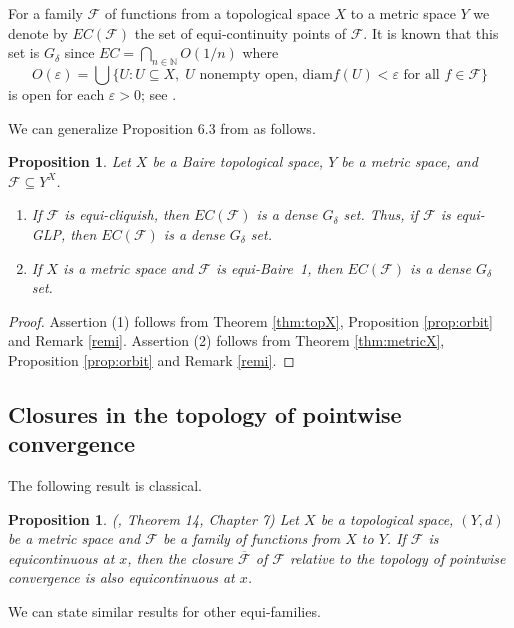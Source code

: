 \documentclass[a4paper]{amsart}
\theoremstyle{plain}
\newtheorem{proposition}[theorem]{Proposition}
\theoremstyle{definition}
\theoremstyle{remark}
\numberwithin{equation}{section}
\begin{document}
    For a family $\mathcal F$ of functions from a topological space $X$ to a metric space $Y$ we denote by $EC(\mathcal F)$ the set of equi-continuity points of $\mathcal F$. It is known that this set is $G_\delta$ since $EC=\bigcap_{n\in\mathbb N}O(1/n)$ where
    $$O(\varepsilon)=\bigcup\{U\colon U\subseteq X,\; U \text{ nonempty open, diam}f(U)<\varepsilon\text{ for all }f\in\mathcal F\}$$
    is open for each $\varepsilon>0$; see \cite{FHT}.
    
We can generalize Proposition 6.3 from \cite{BHH} as follows.

\begin{proposition} \label{propa3}
  Let $X$ be a Baire topological space, $Y$ be a metric space, and $\mathcal F\subseteq Y^X$. 
  \begin{enumerate}
  \item If $\mathcal F$ is equi-cliquish, then $EC(\mathcal F)$ is a dense $G_\delta$ set. Thus, if $\mathcal F$ is equi-GLP, then $EC(\mathcal F)$ is a dense $G_\delta$ set.
  \item If $X$ is a metric space and $\mathcal F$ is equi-Baire~1, then $EC(\mathcal F)$ is a dense $G_\delta$ set.
  \end{enumerate}
\end{proposition}
\begin{proof}
    Assertion (1) follows from Theorem \ref{thm:topX}, Proposition \ref{prop:orbit} and Remark \ref{remi}. Assertion (2) follows from Theorem \ref{thm:metricX}, Proposition \ref{prop:orbit} and Remark \ref{remi}.
    \end{proof}

\subsection{Closures in the topology of pointwise convergence}

The following result is classical.

\begin{proposition} (\cite{Kel}, Theorem 14, Chapter 7)  Let $X$ be a topological space, $(Y,d)$ be a metric space and  $\mathcal F$ be a family of functions from $X$ to $Y$.  If $\mathcal F$ is equicontinuous at $x$, then the closure $\overline{\mathcal F}$ of $\mathcal F$
relative to the topology of pointwise convergence is also equicontinuous at $x$.
\end{proposition}

We can state similar results for other equi-families.
\end{document}
